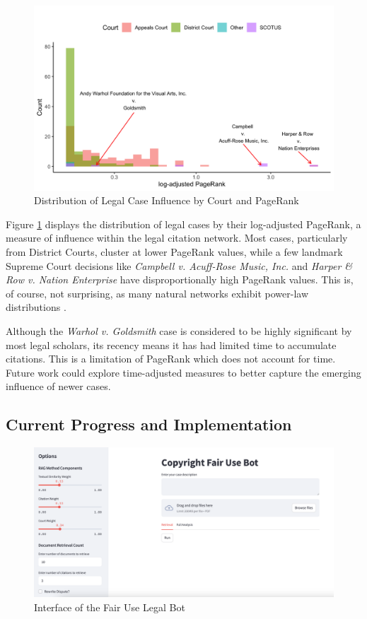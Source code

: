 \begin{figure}[h]
    \centering
    \includegraphics[width=\linewidth]{histogram_pagerank.png}
    \caption{Distribution of Legal Case Influence by Court and PageRank}
    \label{fig:pagerank}
\end{figure}

Figure \ref{fig:pagerank} displays the distribution of legal cases by their log-adjusted PageRank, a measure of influence within the legal citation network. Most cases, particularly from District Courts, cluster at lower PageRank values, while a few landmark Supreme Court decisions like \textit{Campbell v. Acuff-Rose Music, Inc.} and \textit{Harper \& Row v. Nation Enterprise} have disproportionally high PageRank values. This is, of course, not surprising, as many natural networks exhibit power-law distributions \cite{33_ScaleFreeNetwork}.

Although the \textit{Warhol v. Goldsmith} case is considered to be highly significant by most legal scholars, its recency means it has had limited time to accumulate citations. This is a limitation of PageRank which does not account for time. Future work could explore time-adjusted measures to better capture the emerging influence of newer cases.

\subsection{Current Progress and Implementation}

\begin{figure}[h]
    \centering
    \includegraphics[width=\linewidth]{Interface.png}
    \caption{Interface of the Fair Use Legal Bot}
    \label{fig:interface}
\end{figure}

